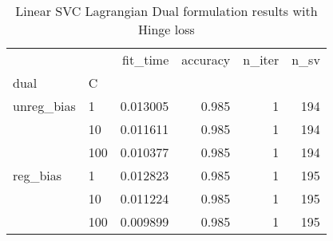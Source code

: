\begin{table}[H]
\centering
\caption{Linear SVC Lagrangian Dual formulation results with Hinge loss}
\label{linear_lagrangian_dual_svc_cv_results}
\begin{tabular}{llrrrr}
\toprule
         &     &  fit\_time &  accuracy &  n\_iter &  n\_sv \\
dual & C &           &           &         &       \\
\midrule
unreg\_bias & 1   &  0.013005 &     0.985 &       1 &   194 \\
         & 10  &  0.011611 &     0.985 &       1 &   194 \\
         & 100 &  0.010377 &     0.985 &       1 &   194 \\
reg\_bias & 1   &  0.012823 &     0.985 &       1 &   195 \\
         & 10  &  0.011224 &     0.985 &       1 &   195 \\
         & 100 &  0.009899 &     0.985 &       1 &   195 \\
\bottomrule
\end{tabular}
\end{table}
